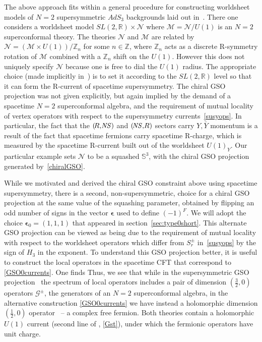 \documentclass[12pt]{article}
\def\epsilonb{{\boldsymbol\epsilon}}
\def\sl{\text{sl}}
\def\sltwo{\ensuremath{SL(2,\bR)}}
\def\uone{U(1)}
\def\({\left(}
\def\){\right)}
\def\NS{{\it \!NS}}
\def\half{\frac12}
\newcommand{\bR}{{\mathbb R}}
\newcommand{\bS}{{\mathbb S}}
\newcommand{\bZ}{{\mathbb Z}}
\numberwithin{equation}{section}
\def\cG{\mathcal {G}} \def\cH{\mathcal {H}} \def\cI{\mathcal {I}}
\def\cM{\mathcal {M}} \def\cN{\mathcal {N}} \def\cO{\mathcal {O}}
\def\half{\frac12}
\def\exp{{\rm exp}}
\begin{document}
The above approach fits within a general procedure for constructing worldsheet models of $N=2$ supersymmetric $AdS_3$ backgrounds laid out in~.  There one considers a worldsheet model $\sltwo\times \cN$ where $\cM={\cN}/{\uone}$ is an $N=2$ superconformal theory.  The theories $\cN$ and $\cM$ are related by $\cN = \( \cM\times\uone \)/\bZ_n$ for some $n\in\bZ$, where $\bZ_n$ acts as a discrete R-symmetry rotation of $\cM$ combined with a $\bZ_n$ shift on the $\uone$. 
However this does not uniquely specify $\cN$ because one is free to dial the $\uone$ radius.  The appropriate choice (made implicitly in~) is to set it according to the $\sltwo$ level so that it can form the R-current of spacetime supersymmetry.  The chiral GSO projection was not given explicitly, but again implied by the demand of a spacetime $N=2$ superconformal algebra, and the requirement of mutual locality of vertex operators with respect to the supersymmetry currents~\eqref{susyops}.  In particular, the fact that the $(\!R,\NS)$ and $(\NS,\!R)$ sectors carry $Y,\bar Y$ momentum is a result of the fact that spacetime fermions carry spacetime R-charge, which is measured by the spacetime R-current built out of the worldsheet $U(1)_Y$.  Our particular example sets $\cN$ to be a squashed $\bS^3$, with the chiral GSO projection generated by~\eqref{chiralGSO}.


While we motivated and derived the chiral GSO constraint above using spacetime supersymmetry, there is a second, non-supersymmetric, choice for a chiral GSO projection at the same value of the squashing parameter, obtained by flipping an odd number of signs in the vector $\epsilonb$ used to define $(-1)^F$.  We will adopt the choice $\epsilonb_0=(1,1,1)$ that appeared in section~\ref{sec:type0short}. This alternate GSO projection can be viewed as being due to the requirement of mutual locality with respect to the worldsheet operators
\eqn[GSO0currents]{
\Psi_r^\pm = \exp\bigg[-\frac\varphi 2 +ir\big(H_\sl\pm H_3\big) \pm\frac {i\,a}2\, Z \pm \frac{i}{\sqrt{2k}}\,Y \bigg]~,
}
which differ from $S_r^\pm$ in~\eqref{susyops} by the sign of $H_3$ in the exponent. To understand this GSO projection better, it is useful to construct the local operators in the spacetime CFT that correspond to \eqref{GSO0currents}. One finds
\eqna[defpsii]{\Psi^\pm(x) \simeq \int\!d^2z\, 
\left(\Psi^\pm_\half-x \Psi^\pm_{-\half}\right)e^{-\bar\varphi}\,\bar\psi(\bar x;\bar z)\Phi_1(x,\bar x;z,\bar z) ~.}
Thus, we see that while in the supersymmetric GSO projection \susyops\ the spectrum of local operators includes a pair of dimension $\left(\frac32,0\right)$ operators $\cG^\pm$, the generators of an $N=2$ superconformal algebra, in the alternative construction \eqref{GSO0currents} we have instead a holomorphic dimension $\left(\frac12,0\right)$ operator \ -- a complex free fermion. Both theories contain a holomorphic $U(1)$ current (second line of \susyops, \eqref{Gst}), under which the fermionic operators have unit charge.
\end{document}

